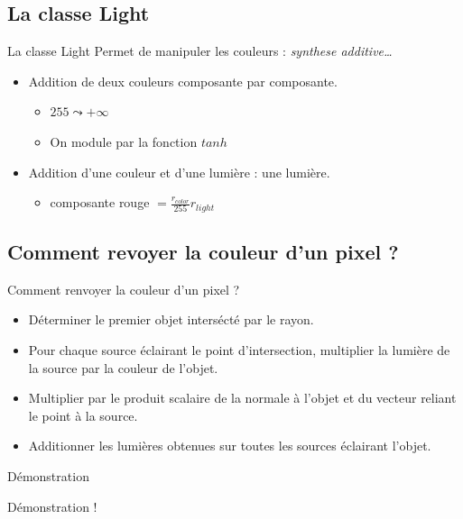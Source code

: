 \documentclass{beamer}
\begin{document}
	\subsection{La classe Light}
	\begin{frame}{La classe Light}
		Permet de manipuler les couleurs : \emph{synthese additive\dots}
		\begin{itemize}
			\item Addition de deux couleurs composante par composante. 
			\begin{itemize}
				\item $255 \leadsto +\infty$
				\item On module par la fonction $tanh$
			\end{itemize}
			\item Addition d'une couleur et d'une lumière : une lumière.
			\begin{itemize}
				\item composante rouge $= \frac{r_{color}}{255}r_{light}$
			\end{itemize}
		\end{itemize}		
	\end{frame}

	\subsection{Comment revoyer la couleur d'un pixel ?}
		\begin{frame}{Comment renvoyer la couleur d'un pixel ?}
			\begin{itemize}
				\item Déterminer le premier objet intersécté par le rayon. 
				\item Pour chaque source éclairant le point d'intersection, multiplier la lumière de la source par la couleur de l'objet.
				\item Multiplier par le produit scalaire de la normale à l'objet et du vecteur reliant le point à la source.
				\item Additionner les lumières obtenues sur toutes les sources éclairant l'objet.
			\end{itemize}
		\end{frame}	
	
	\begin{frame}{Démonstration}
		\begin{center}		
			Démonstration !
		\end{center}
	\end{frame}
\end{document}
